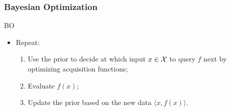 \documentclass[grey]{beamer}
\begin{document}
 \begin{frame}
 \frametitle{Bayesian Optimization}
 

 \begin{block}{BO}
   \begin{itemize}
   \item Repeat:
   \begin{enumerate}
    \item Use the prior to decide at which input $x \in \cal X$ to query $f$ next
    by optimizing acquisition functions;
    \item Evaluate $f(x)$;
    \item Update the prior based on the new data 
    $\langle{}x, f(x)\rangle$.
   \end{enumerate} 
  \end{itemize}
  \end{block}
 \end{frame}
 
\end{document}
